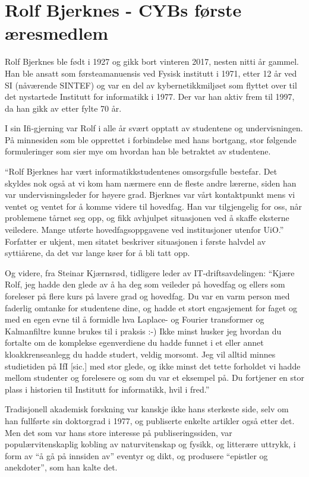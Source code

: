 \chapter[Rolf Bjerknes]{Rolf Bjerknes - CYBs første æresmedlem}

\author{Skrevet av Narve Trædal}

Rolf Bjerknes ble født i 1927 og gikk bort vinteren 2017, nesten nitti år gammel. Han ble ansatt som førsteamanuensis ved Fysisk institutt i 1971, etter 12 år ved SI (nåværende SINTEF) og var en del av kybernetikkmiljøet som flyttet over til det nystartede Institutt for informatikk i 1977. Der var han
aktiv frem til 1997, da han gikk av etter fylte 70 år.

I sin Ifi-gjerning var Rolf i alle år svært opptatt av studentene og undervisningen. På minnesiden som ble opprettet i forbindelse med hans bortgang, stor følgende formuleringer som sier mye om hvordan han ble betraktet av studentene.

``Rolf Bjerknes har vært informatikkstudentenes omsorgsfulle bestefar. Det skyldes nok også at vi kom ham nærmere enn de fleste andre lærerne, siden han var undervisningsleder for høyere grad. Bjerknes var vårt kontaktpunkt mens vi ventet og ventet for å komme videre til hovedfag. Han var tilgjengelig for oss, når problemene tårnet seg opp, og fikk avhjulpet situasjonen ved å skaffe eksterne veiledere. Mange utførte hovedfagsoppgavene ved institusjoner utenfor UiO.'' Forfatter er ukjent, men sitatet beskriver situasjonen i første halvdel av syttiårene, da det var lange køer for å bli tatt opp.

Og videre, fra Steinar Kjærnsrød, tidligere leder av IT-driftsavdelingen: ``Kjære Rolf, jeg hadde den glede av å ha deg som veileder på hovedfag og ellers som foreleser på flere kurs på lavere grad og hovedfag. Du var en varm person med faderlig omtanke for studentene dine, og hadde et stort engasjement for faget og med en egen evne til å formidle hva Laplace- og Fourier transformer og Kalmanfiltre kunne brukes til i praksis :-) Ikke minst husker jeg hvordan du fortalte om de komplekse egenverdiene du hadde funnet i et eller annet kloakkrenseanlegg du hadde studert, veldig morsomt. Jeg vil alltid minnes studietiden på IfI [sic.] med stor glede, og ikke minst det tette forholdet vi hadde mellom studenter og forelesere og som du var et eksempel på. Du fortjener en stor plass i historien til Institutt for informatikk, hvil i fred.''

Tradisjonell akademisk forskning var kanskje ikke hans sterkeste side, selv om han fullførte sin doktorgrad i 1977, og publiserte enkelte artikler også etter det. Men det som var hans store interesse på publiseringssiden, var populærvitenskaplig kobling av naturvitenskap og fysikk, og litterære uttrykk, i form av ``å gå på innsiden av'' eventyr og dikt, og produsere ``epistler og anekdoter'', som han kalte det.
